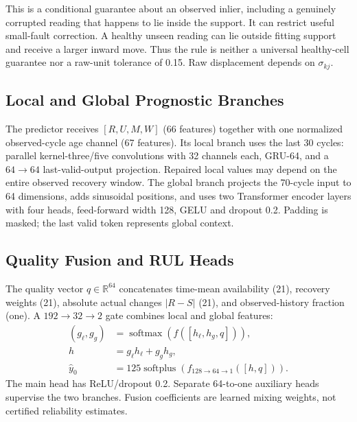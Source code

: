 \documentclass[conference]{IEEEtran}
\begin{document}
This is a conditional guarantee about an observed inlier, including a genuinely corrupted reading that happens to lie inside the support. It can restrict useful small-fault correction. A healthy unseen reading can lie outside fitting support and receive a larger inward move. Thus the rule is neither a universal healthy-cell guarantee nor a raw-unit tolerance of 0.15. Raw displacement depends on $\sigma_{kj}$.



\subsection{\textbf{Local and Global Prognostic Branches}}
The predictor receives $[R,U,M,W]$ (66 features) together with one normalized observed-cycle age channel (67 features). Its local branch uses the last 30 cycles: parallel kernel-three/five convolutions with 32 channels each, GRU-64, and a $64\rightarrow64$ last-valid-output projection. Repaired local values may depend on the entire observed recovery window. The global branch projects the 70-cycle input to 64 dimensions, adds sinusoidal positions, and uses two Transformer encoder layers with four heads, feed-forward width 128, GELU and dropout 0.2. Padding is masked; the last valid token represents global context.

\subsection{\textbf{Quality Fusion and RUL Heads}}
The quality vector $q\in\mathbb{R}^{64}$ concatenates time-mean availability (21), recovery weights (21), absolute actual changes $|R-S|$ (21), and observed-history fraction (one). A $192\rightarrow32\rightarrow2$ gate combines local and global features:
\begin{align}
 (g_\ell,g_g)&=\operatorname{softmax}(f([h_\ell,h_g,q])),\\
 h&=g_\ell h_\ell+g_g h_g,\\
 \hat y_0&=125\operatorname{softplus}(f_{128\to64\to1}([h,q])).
\end{align}
The main head has ReLU/dropout 0.2. Separate 64-to-one auxiliary heads supervise the two branches. Fusion coefficients are learned mixing weights, not certified reliability estimates.
\end{document}
